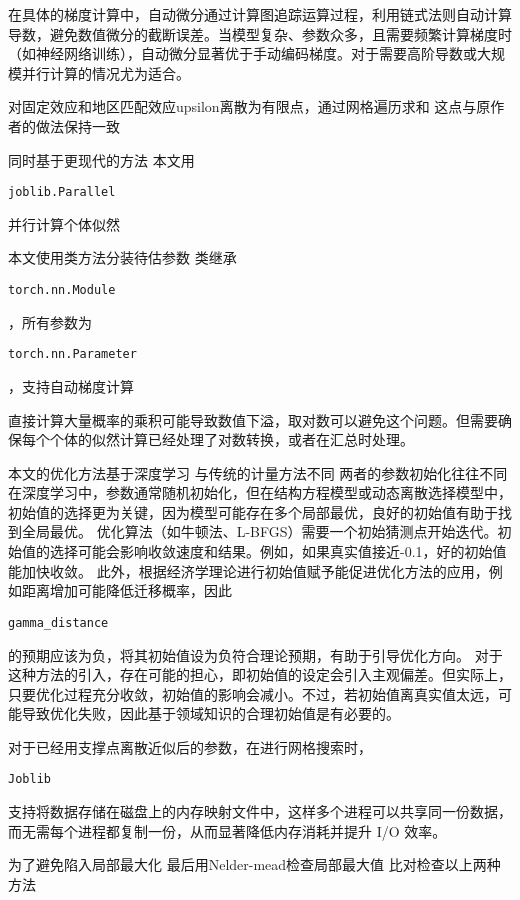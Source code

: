 \documentclass[a4paper,12pt]{article}
\begin{document}
在具体的梯度计算中，自动微分通过计算图追踪运算过程，利用链式法则自动计算导数，避免数值微分的截断误差。当模型复杂、参数众多，且需要频繁计算梯度时（如神经网络训练），自动微分显著优于手动编码梯度。对于需要高阶导数或大规模并行计算的情况尤为适合。

对固定效应和地区匹配效应upsilon离散为有限点，通过网格遍历求和
这点与原作者的做法保持一致

同时基于更现代的方法
本文用\begin{verbatim}joblib.Parallel\end{verbatim}并行计算个体似然

本文使用类方法分装待估参数
类继承\begin{verbatim}torch.nn.Module\end{verbatim}，所有参数为\begin{verbatim}torch.nn.Parameter\end{verbatim}，支持自动梯度计算

直接计算大量概率的乘积可能导致数值下溢，取对数可以避免这个问题。但需要确保每个个体的似然计算已经处理了对数转换，或者在汇总时处理。

本文的优化方法基于深度学习
与传统的计量方法不同
两者的参数初始化往往不同
在深度学习中，参数通常随机初始化，但在结构方程模型或动态离散选择模型中，初始值的选择更为关键，因为模型可能存在多个局部最优，良好的初始值有助于找到全局最优。
优化算法（如牛顿法、L-BFGS）需要一个初始猜测点开始迭代。初始值的选择可能会影响收敛速度和结果。例如，如果真实值接近-0.1，好的初始值能加快收敛。
此外，根据经济学理论进行初始值赋予能促进优化方法的应用，例如距离增加可能降低迁移概率，因此\begin{verbatim}gamma_distance\end{verbatim}的预期应该为负，将其初始值设为负符合理论预期，有助于引导优化方向。
对于这种方法的引入，存在可能的担心，即初始值的设定会引入主观偏差。但实际上，只要优化过程充分收敛，初始值的影响会减小。不过，若初始值离真实值太远，可能导致优化失败，因此基于领域知识的合理初始值是有必要的。


对于已经用支撑点离散近似后的参数，在进行网格搜索时，\begin{verbatim}Joblib\end{verbatim}支持将数据存储在磁盘上的内存映射文件中，这样多个进程可以共享同一份数据，而无需每个进程都复制一份，从而显著降低内存消耗并提升 I/O 效率。

为了避免陷入局部最大化
最后用Nelder-mead检查局部最大值
比对检查以上两种方法




\end{document}
